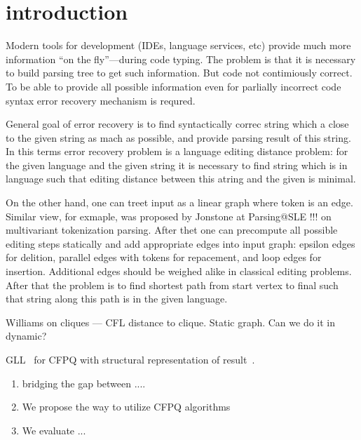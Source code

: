 \section{introduction}

Modern tools for development (IDEs, language services, etc) provide much more information ``on the fly''---during code typing.
The problem is that it is necessary to build parsing tree to get such information.
But code not contimiously correct.
To be able to provide all possible information even for parlially incorrect code syntax error recovery mechanism is requred.

General goal of error recovery is to find syntactically correc string which a close to the given string as mach as possible, and provide parsing result of this string.
In this terms error recovery problem is a language editing distance problem: for the given language and the given string it is necessary to find string which is in language such that editing distance between this atring and the given is minimal.

On the other hand, one can treet input as a linear graph where token is an edge.
Similar view, for exmaple, was proposed by Jonstone at Parsing@SLE !!! on multivariant tokenization parsing.
After thet one can precompute all possible editing steps statically and add appropriate edges into input graph: epsilon edges for delition, parallel edges with tokens for repacement, and loop edges for insertion.
Additional edges should be weighed alike in classical editing problems.
After that the problem is to find shortest path from start vertex to final such that string along this path is in the given language.

Williams on cliques --- CFL distance to clique.
Static graph.
Can we do it in dynamic?

GLL~\cite{scott2010gll} for CFPQ with structural representation of result~\cite{GrigorevR16}.

\begin{enumerate}
\item bridging the gap between ....
\item We propose the way to utilize CFPQ algorithms
\item We evaluate ...
\end{enumerate}
